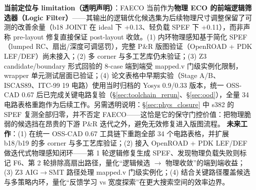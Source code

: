 \documentclass[journal]{IEEEtran}
\begin{document}
\textbf{当前定位与 limitation（透明声明）}：FAECO 当前作为\textbf{物理 ECO 的前端逻辑筛选器（Logic Filter）}——其输出的逻辑优化候选集为后续物理尺寸调整保留了可测的改善余量（b18 JOINT 在 ideal 下 +0.13、轻负载 SPEF 下 +0.11），而非声称 pre-layout 修复直接保证 post-layout 收敛。(1) 内环物理感知基于简化 SPEF（lumped RC、扇出/深度可调惩罚），完整 P\&R 版图验证（OpenROAD + PDK LEF/DEF）尚未接入；(2) 多 corner 与多工艺库仍未验证；(3) Z3 candidate/boundary 形式回验的 8-case 端到端受 mapped.v 门级实例化限制，wrapper 单元测试层面已验证；(4) 论文表格中早期实验（Stage A/B、ISCAS89、ITC-99 19 电路）使用当时归档的 Yosys 0.9/0.33 版本，统一 OSS-CAD 0.67 后已完成关键电路复验（\S\ref{sec:toolchain_rerun}、\S\ref{sec:ood}），全量 34 电路表格重跑作为后续工作。另需透明说明：\S\ref{sec:phys_closure} 中 s382 的 SPEF 复测全部归零，并不否定 FAECO——这恰是它的保守门控价值：把物理脆弱的候选挡在昂贵的下游 P\&R 迭代之外，避免无效修复进入版图流程。
\textbf{未来工作}：(1) 在统一 OSS-CAD 0.67 工具链下重跑全部 34 个电路表格，并扩展 b18/b19 的多 corner 与多工艺库验证；(2) 接入 OpenROAD + PDK LEF/DEF 做迭代式物理感知闭环——第 1 轮逻辑修复生成 SPEF、发现物理负载失败则标记 F6、第 2 轮排除高扇出路径，量化“逻辑候选 $\rightarrow$ 物理收敛”的端到端收益；(3) Z3 AIG$\rightarrow$SMT 路径处理 mapped.v 门级实例化；(4) 结合关键路径覆盖候选与多策略内环，量化“反馈学习 vs 宽度探索”在更大搜索空间的效率边界。
\end{document}
